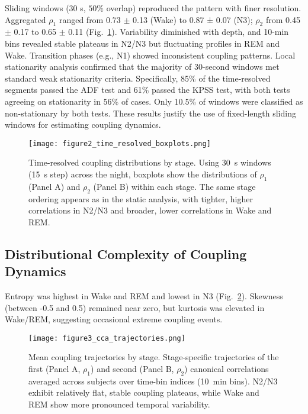 Sliding windows (30 s, $50\%$ overlap) reproduced the pattern with finer resolution. Aggregated $\rho_1$ ranged from 0.73 $\pm$ 0.13 (Wake) to 0.87 ± 0.07 (N3); $\rho_2$ from 0.45 $\pm$ 0.17 to 0.65 $\pm$ 0.11 (Fig.~\ref{fig:figure2}). Variability diminished with depth, and 10-min bins revealed stable plateaus in N2/N3 but fluctuating profiles in REM and Wake. Transition phases (e.g., N1) showed inconsistent coupling patterns.
Local stationarity analysis confirmed that the majority of 30-second windows met standard weak stationarity criteria. Specifically, 85\% of the time-resolved segments passed the ADF test and 61\% passed the KPSS test, with both tests agreeing on stationarity in 56\% of cases. Only 10.5\% of windows were classified as non-stationary by both tests. These results justify the use of fixed-length sliding windows for estimating coupling dynamics.%
\begin{figure}[!t]
\centering
\texttt{[image: figure2\_time\_resolved\_boxplots.png]}%
\caption{Time-resolved coupling distributions by stage. Using 30~s windows (15~s step) across the night, boxplots show the distributions of $\rho_1$ (Panel A) and $\rho_2$ (Panel B) within each stage. The same stage ordering appears as in the static analysis, with tighter, higher correlations in N2/N3 and broader, lower correlations in Wake and REM.}\label{fig:figure2}
\end{figure}%
\vspace{0pt}%

\subsection{Distributional Complexity of Coupling Dynamics}
\vspace{0pt}%
Entropy was highest in Wake and REM and lowest in N3 (Fig.~\ref{fig:figure3}). Skewness (between -0.5 and 0.5) remained near zero, but kurtosis was elevated in Wake/REM, suggesting occasional extreme coupling events.%
\begin{figure}[!t]
\centering
\texttt{[image: figure3\_cca\_trajectories.png]}%
\caption{Mean coupling trajectories by stage. Stage-specific trajectories of the first (Panel A, $\rho_1$) and second (Panel B, $\rho_2$) canonical correlations averaged across subjects over time-bin indices (10~min bins). N2/N3 exhibit relatively flat, stable coupling plateaus, while Wake and REM show more pronounced temporal variability.}\label{fig:figure3}
\end{figure}%
\vspace{0pt}%

